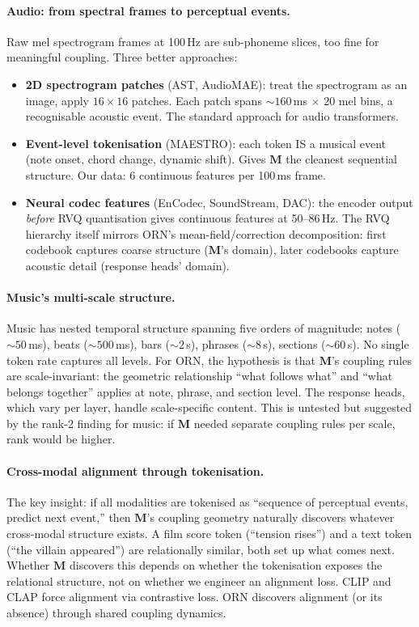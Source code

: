 \documentclass[11pt, a4paper]{article}
\newcommand{\M}{\mathbf{M}}
\theoremstyle{plain}
\theoremstyle{remark}
\begin{document}
\paragraph{Audio: from spectral frames to perceptual events.}
Raw mel spectrogram frames at 100\,Hz are sub-phoneme slices, too fine for meaningful coupling.
Three better approaches:
\begin{itemize}[nosep]
    \item \textbf{2D spectrogram patches} (AST, AudioMAE): treat the spectrogram as an image, apply $16{\times}16$ patches.  Each patch spans ${\sim}160$\,ms $\times$ 20 mel bins, a recognisable acoustic event.  The standard approach for audio transformers.
    \item \textbf{Event-level tokenisation} (MAESTRO): each token IS a musical event (note onset, chord change, dynamic shift).  Gives $\M$ the cleanest sequential structure.  Our data: 6 continuous features per 100\,ms frame.
    \item \textbf{Neural codec features} (EnCodec, SoundStream, DAC): the encoder output \emph{before} RVQ quantisation gives continuous features at 50--86\,Hz.  The RVQ hierarchy itself mirrors ORN's mean-field/correction decomposition: first codebook captures coarse structure ($\M$'s domain), later codebooks capture acoustic detail (response heads' domain).
\end{itemize}

\paragraph{Music's multi-scale structure.}
Music has nested temporal structure spanning five orders of magnitude: notes (${\sim}50$\,ms), beats (${\sim}500$\,ms), bars (${\sim}2$\,s), phrases (${\sim}8$\,s), sections (${\sim}60$\,s).
No single token rate captures all levels.
For ORN, the hypothesis is that $\M$'s coupling rules are scale-invariant: the geometric relationship ``what follows what'' and ``what belongs together'' applies at note, phrase, and section level.
The response heads, which vary per layer, handle scale-specific content.
This is untested but suggested by the rank-2 finding for music: if $\M$ needed separate coupling rules per scale, rank would be higher.

\paragraph{Cross-modal alignment through tokenisation.}
The key insight: if all modalities are tokenised as ``sequence of perceptual events, predict next event,'' then $\M$'s coupling geometry naturally discovers whatever cross-modal structure exists.
A film score token (``tension rises'') and a text token (``the villain appeared'') are relationally similar, both set up what comes next.
Whether $\M$ discovers this depends on whether the tokenisation exposes the relational structure, not on whether we engineer an alignment loss.
CLIP and CLAP force alignment via contrastive loss.
ORN discovers alignment (or its absence) through shared coupling dynamics.
\end{document}
